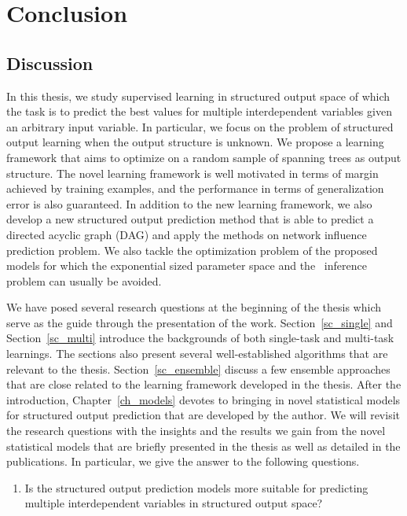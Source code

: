 {%
%
\chapter{Conclusion}\label{ch_conclusion}

\section{Discussion}

In this thesis, we study supervised learning in structured output space of which the task is to predict the best values for multiple interdependent variables given an arbitrary input variable.
In particular, we focus on the problem of structured output learning when the output structure is unknown.
We propose a learning framework that aims to optimize on a random sample of spanning trees as output structure.
The novel learning framework is well motivated in terms of margin achieved by training examples, and the performance in terms of generalization error is also guaranteed.
In addition to the new learning framework, we also develop a new structured output prediction method that is able to predict a directed acyclic graph (DAG) and apply the methods on network influence prediction problem.
We also tackle the optimization problem of the proposed models for which the exponential sized parameter space and the \nphard\ inference problem can usually be avoided.

We have posed several research questions at the beginning of the thesis which serve as the guide through the presentation of the work.
Section~\ref{sc_single} and Section~\ref{sc_multi} introduce the backgrounds of both single-task and multi-task learnings.
The sections also present several well-established algorithms that are relevant to the thesis.
Section~\ref{sc_ensemble} discuss a few ensemble approaches that are close related to the learning framework developed in the thesis.
After the introduction, Chapter~\ref{ch_models} devotes to bringing in novel statistical models for structured output prediction that are developed by the author.
We will revisit the research questions with the insights and the results we gain from the novel statistical models that are briefly presented in the thesis as well as detailed in the publications.
In particular, we give the answer to the following questions.

\begin{enumerate}[label=\textbf{Q \Roman*}:]
\item Is the structured output prediction models more suitable for predicting multiple interdependent variables in structured output space?


\end{enumerate}}
